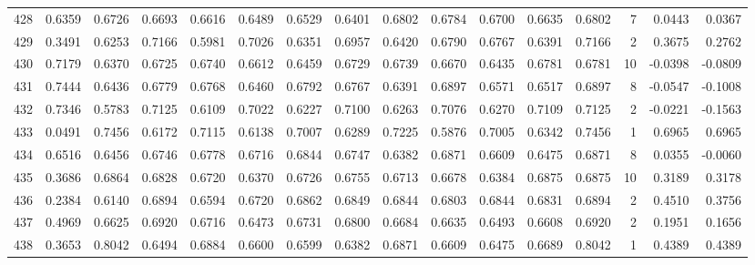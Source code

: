 \begin{tabular}{lrrrrrrrrrrrrrrr}
428 &      0.6359 &  0.6726 &  0.6693 &  0.6616 &  0.6489 &  0.6529 &  0.6401 &  0.6802 &  0.6784 &  0.6700 &   0.6635 &     0.6802 &      7 &                    0.0443 &                     0.0367 \\
429 &      0.3491 &  0.6253 &  0.7166 &  0.5981 &  0.7026 &  0.6351 &  0.6957 &  0.6420 &  0.6790 &  0.6767 &   0.6391 &     0.7166 &      2 &                    0.3675 &                     0.2762 \\
430 &      0.7179 &  0.6370 &  0.6725 &  0.6740 &  0.6612 &  0.6459 &  0.6729 &  0.6739 &  0.6670 &  0.6435 &   0.6781 &     0.6781 &     10 &                   -0.0398 &                    -0.0809 \\
431 &      0.7444 &  0.6436 &  0.6779 &  0.6768 &  0.6460 &  0.6792 &  0.6767 &  0.6391 &  0.6897 &  0.6571 &   0.6517 &     0.6897 &      8 &                   -0.0547 &                    -0.1008 \\
432 &      0.7346 &  0.5783 &  0.7125 &  0.6109 &  0.7022 &  0.6227 &  0.7100 &  0.6263 &  0.7076 &  0.6270 &   0.7109 &     0.7125 &      2 &                   -0.0221 &                    -0.1563 \\
433 &      0.0491 &  0.7456 &  0.6172 &  0.7115 &  0.6138 &  0.7007 &  0.6289 &  0.7225 &  0.5876 &  0.7005 &   0.6342 &     0.7456 &      1 &                    0.6965 &                     0.6965 \\
434 &      0.6516 &  0.6456 &  0.6746 &  0.6778 &  0.6716 &  0.6844 &  0.6747 &  0.6382 &  0.6871 &  0.6609 &   0.6475 &     0.6871 &      8 &                    0.0355 &                    -0.0060 \\
435 &      0.3686 &  0.6864 &  0.6828 &  0.6720 &  0.6370 &  0.6726 &  0.6755 &  0.6713 &  0.6678 &  0.6384 &   0.6875 &     0.6875 &     10 &                    0.3189 &                     0.3178 \\
436 &      0.2384 &  0.6140 &  0.6894 &  0.6594 &  0.6720 &  0.6862 &  0.6849 &  0.6844 &  0.6803 &  0.6844 &   0.6831 &     0.6894 &      2 &                    0.4510 &                     0.3756 \\
437 &      0.4969 &  0.6625 &  0.6920 &  0.6716 &  0.6473 &  0.6731 &  0.6800 &  0.6684 &  0.6635 &  0.6493 &   0.6608 &     0.6920 &      2 &                    0.1951 &                     0.1656 \\
438 &      0.3653 &  0.8042 &  0.6494 &  0.6884 &  0.6600 &  0.6599 &  0.6382 &  0.6871 &  0.6609 &  0.6475 &   0.6689 &     0.8042 &      1 &                    0.4389 &                     0.4389 \\

\end{tabular}
